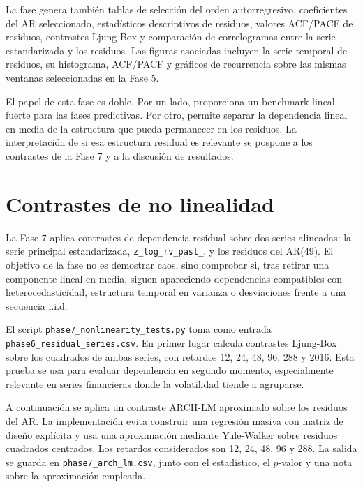 La fase genera también tablas de selección del orden autorregresivo, coeficientes del AR seleccionado, estadísticos descriptivos de residuos, valores ACF/PACF de residuos, contrastes Ljung-Box y comparación de correlogramas entre la serie estandarizada y los residuos. Las figuras asociadas incluyen la serie temporal de residuos, su histograma, ACF/PACF y gráficos de recurrencia sobre las mismas ventanas seleccionadas en la Fase 5.

El papel de esta fase es doble. Por un lado, proporciona un benchmark lineal fuerte para las fases predictivas. Por otro, permite separar la dependencia lineal en media de la estructura que pueda permanecer en los residuos. La interpretación de si esa estructura residual es relevante se pospone a los contrastes de la Fase 7 y a la discusión de resultados.

\section{Contrastes de no linealidad}\label{sec:contrastes-no-linealidad}

La Fase 7 aplica contrastes de dependencia residual sobre dos series alineadas: la serie principal estandarizada, \texttt{z\_\allowbreak log\_\allowbreak rv\_\allowbreak past\_}, y los residuos del AR(49). El objetivo de la fase no es demostrar caos, sino comprobar si, tras retirar una componente lineal en media, siguen apareciendo dependencias compatibles con heterocedasticidad, estructura temporal en varianza o desviaciones frente a una secuencia i.i.d.

El script \texttt{phase7\_\allowbreak nonlinearity\_\allowbreak tests.py} toma como entrada \texttt{phase6\_\allowbreak residual\_\allowbreak series.csv}. En primer lugar calcula contrastes Ljung-Box sobre los cuadrados de ambas series, con retardos 12, 24, 48, 96, 288 y 2016. Esta prueba se usa para evaluar dependencia en segundo momento, especialmente relevante en series financieras donde la volatilidad tiende a agruparse.

A continuación se aplica un contraste ARCH-LM aproximado sobre los residuos del AR. La implementación evita construir una regresión masiva con matriz de diseño explícita y usa una aproximación mediante Yule-Walker sobre residuos cuadrados centrados. Los retardos considerados son 12, 24, 48, 96 y 288. La salida se guarda en \texttt{phase7\_\allowbreak arch\_\allowbreak lm.csv}, junto con el estadístico, el \(p\)-valor y una nota sobre la aproximación empleada.

